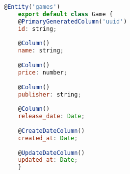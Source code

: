 \begin{lstlisting}[language=JavaScript, caption={A Entidade Game},captionpos=b, label=alg:entity]
    @Entity('games')
    export default class Game {
    @PrimaryGeneratedColumn('uuid')
    id: string;
    
    @Column()
    name: string;
    
    @Column()
    price: number;
    
    @Column()
    publisher: string;
    
    @Column()
    release_date: Date;
    
    @CreateDateColumn()
    created_at: Date;
    
    @UpdateDateColumn()
    updated_at: Date;
    }
\end{lstlisting}
